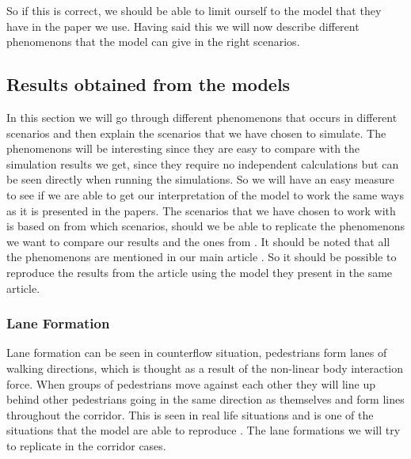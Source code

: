 So if this is correct, we should be able to limit ourself to the model that they have in the paper we use.
Having said this we will now describe different phenomenons that the model can give in the right scenarios.




\subsection{Results obtained from the models}
In this section we will go through different phenomenons that occurs in different scenarios and then
explain the scenarios that we have chosen to simulate. The phenomenons will be interesting since they
are easy to compare with the simulation results we get, since they require no independent calculations
but can be seen directly when running the simulations. So we will have an easy measure to see if we
are able to get our interpretation of the model to work the same ways as it is presented in the papers.
The scenarios that we have chosen to work with is based on from which scenarios, should we be able
to replicate the phenomenons we want to compare our results and the ones from \cite{self-org}.
It should be noted that all the phenomenons are mentioned in our main article \cite{self-org}.
So it should be possible to reproduce the results from the article using the model they present in the same article.

\subsubsection{Lane Formation}
Lane formation can be seen in counterflow situation, pedestrians form lanes of walking
directions, which is thought as a result of the non-linear body interaction
force. When groups of pedestrians move against each other they will line up behind other
pedestrians going in the same direction as themselves and form lines throughout the corridor.
This is seen in real life situations and is one of the situations that the model are able to reproduce \cite{self-org}.
The lane formations we will try to replicate in the corridor cases.

